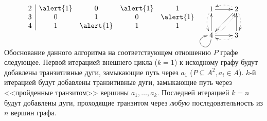 \begin{frame}
{\[\begin{matrix}
\begin{array}{c|cccc}
                    2&\alert{1}&0&\alert{1}&1 \\
                    3&0&1&0&\alert{1} \\
                    4&1&\alert{1}&1&1
                \end{array}
                &
                \raisebox{2\height}{
                    {\xymatrix{
                        1 \ar@{->}[r] \ar@{<.}@/^/[r]
                            &2 \ar@{->}[dl] \ar@{<.}@/^/[dl]
                                \\
                        4 \ar@{->}[r] \ar@{<.}@/_/[r] 
                          \ar@{->}[u] \ar@{<.}@/^/[u] \ar@{->}@(d,l)[]
                            &3 \ar@{->}[u] \ar@{<.}@/_/[u] 
                    }}
                }
            \end{matrix}
        \]
    }
\end{frame}

Обоснование данного алгоритма на соответствующем отношению $P$ графе следующее. Первой итерацией внешнего цикла ($k=1$) к исходному графу будут добавлены транзитивные дуги, замыкающие путь через $a_1$ ($P\subseteq A^2, a_i\in A$). $k$-й итерацией будут добавлены транзитивные дуги, замыкающие путь через <<пройденные транзитом>> вершины $a_1,\ldots,a_k$. Последней итерацией $k=n$ будут добавлены дуги, проходящие транзитом через \emph{любую} последовательность из $n$ вершин графа.

